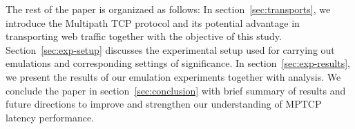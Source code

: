The rest of the paper is organizaed as follows: In section~\ref{sec:transports}, we introduce the Multipath TCP protocol and its potential advantage in transporting
web traffic together with the objective of this study. Section~\ref{sec:exp-setup} discusses the experimental setup used for carrying out emulations and
corresponding settings of significance. In section~\ref{sec:exp-results}, we present the results of our emulation experiments together with analysis.
We conclude the paper in section~\ref{sec:conclusion} with brief summary of results and future directions to improve and strengthen our understanding of 
MPTCP latency performance.

